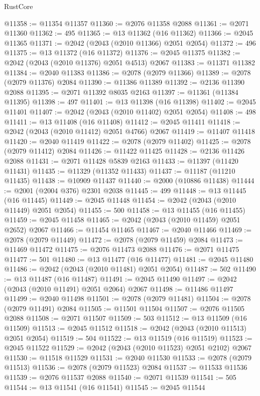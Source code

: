 \begin{lexlean}{RustCore}
\begin{coremodule}
@11358 := @11354 @11357
@11360 := @2076 @11358 @2088
@11361 := @2071 @11360
@11362 := 495
@11365 := @13 @11362 (@16 @11362)
@11366 := @2045 @11365
@11371 := @2042 (@2043 (@2010 @11366) @2051 @2054)
@11372 := 496
@11375 := @13 @11372 (@16 @11372)
@11376 := @2045 @11375
@11382 := @2042 (@2043 (@2010 @11376) @2051 @4513) @2067
@11383 := @11371 @11382
@11384 := @2040 @11383
@11386 := @2078 (@2079 @11366)
@11389 := @2078 (@2079 @11376) @2084
@11390 := @11386 @11389
@11392 := @2136 @11390 @2088
@11395 := @2071 @11392 @8035 @2163
@11397 := @11361 (@11384 @11395)
@11398 := 497
@11401 := @13 @11398 (@16 @11398)
@11402 := @2045 @11401
@11407 := @2042 (@2043 (@2010 @11402) @2051 @2054)
@11408 := 498
@11411 := @13 @11408 (@16 @11408)
@11412 := @2045 @11411
@11418 := @2042 (@2043 (@2010 @11412) @2051 @4766) @2067
@11419 := @11407 @11418
@11420 := @2040 @11419
@11422 := @2078 (@2079 @11402)
@11425 := @2078 (@2079 @11412) @2084
@11426 := @11422 @11425
@11428 := @2136 @11426 @2088
@11431 := @2071 @11428 @5839 @2163
@11433 := @11397 (@11420 @11431)
@11435 := @11329 (@11352 @11433)
@11437 := @11187 (@11210 @11435)
@11438 := @10909 @11437
@11440 := @2000 (@10886 @11438)
@11444 := @2001 (@2004 @376) @2301 @2038
@11445 := 499
@11448 := @13 @11445 (@16 @11445)
@11449 := @2045 @11448
@11454 := @2042 (@2043 (@2010 @11449) @2051 @2054)
@11455 := 500
@11458 := @13 @11455 (@16 @11455)
@11459 := @2045 @11458
@11465 := @2042 (@2043 (@2010 @11459) @2051 @2652) @2067
@11466 := @11454 @11465
@11467 := @2040 @11466
@11469 := @2078 (@2079 @11449)
@11472 := @2078 (@2079 @11459) @2084
@11473 := @11469 @11472
@11475 := @2076 @11473 @2088
@11476 := @2071 @11475
@11477 := 501
@11480 := @13 @11477 (@16 @11477)
@11481 := @2045 @11480
@11486 := @2042 (@2043 (@2010 @11481) @2051 @2054)
@11487 := 502
@11490 := @13 @11487 (@16 @11487)
@11491 := @2045 @11490
@11497 := @2042 (@2043 (@2010 @11491) @2051 @2064) @2067
@11498 := @11486 @11497
@11499 := @2040 @11498
@11501 := @2078 (@2079 @11481)
@11504 := @2078 (@2079 @11491) @2084
@11505 := @11501 @11504
@11507 := @2076 @11505 @2088
@11508 := @2071 @11507
@11509 := 503
@11512 := @13 @11509 (@16 @11509)
@11513 := @2045 @11512
@11518 := @2042 (@2043 (@2010 @11513) @2051 @2054)
@11519 := 504
@11522 := @13 @11519 (@16 @11519)
@11523 := @2045 @11522
@11529 := @2042 (@2043 (@2010 @11523) @2051 @2102) @2067
@11530 := @11518 @11529
@11531 := @2040 @11530
@11533 := @2078 (@2079 @11513)
@11536 := @2078 (@2079 @11523) @2084
@11537 := @11533 @11536
@11539 := @2076 @11537 @2088
@11540 := @2071 @11539
@11541 := 505
@11544 := @13 @11541 (@16 @11541)
@11545 := @2045 @11544

\end{coremodule}
\end{lexlean}
